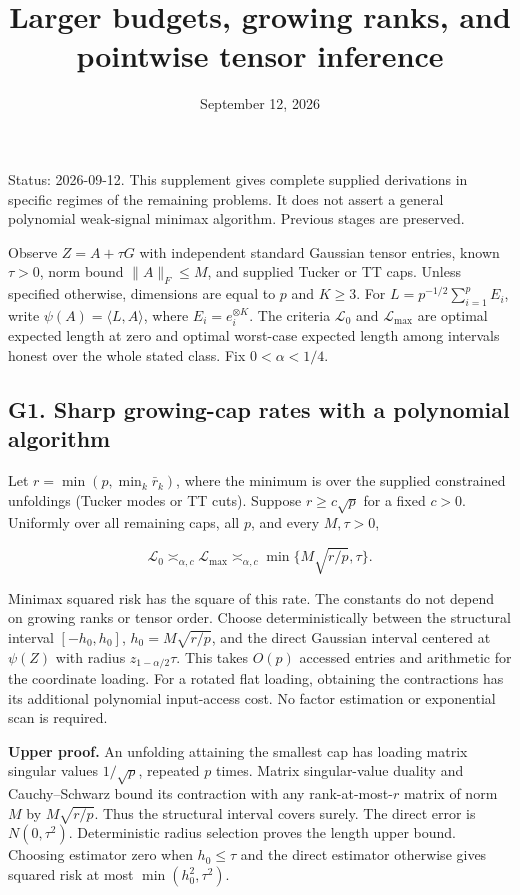 \documentclass[
  10pt,
]{article}
\title{Larger budgets, growing ranks, and pointwise tensor inference}
\author{}
\date{September 12, 2026}
\begin{document}
\maketitle

Status: 2026-09-12. This supplement gives complete supplied derivations
in specific regimes of the remaining problems. It does not assert a
general polynomial weak-signal minimax algorithm. Previous stages are
preserved.

Observe \(Z=A+\tau G\) with independent standard Gaussian tensor
entries, known \(\tau>0\), norm bound \(\|A\|_F\le M\), and supplied
Tucker or TT caps. Unless specified otherwise, dimensions are equal to
\(p\) and \(K\ge3\). For \(L=p^{-1/2}\sum_{i=1}^p E_i\), write
\(\psi(A)=\langle L,A\rangle\), where \(E_i=e_i^{\otimes K}\). The
criteria \(\mathcal L_0\) and \(\mathcal L_{\max}\) are optimal expected
length at zero and optimal worst-case expected length among intervals
honest over the whole stated class. Fix \(0<\alpha<1/4\).

\subsection{G1. Sharp growing-cap rates with a polynomial
algorithm}\label{g1.-sharp-growing-cap-rates-with-a-polynomial-algorithm}

Let \(r=\min(p,\min_k\bar r_k)\), where the minimum is over the supplied
constrained unfoldings (Tucker modes or TT cuts). Suppose
\(r\ge c\sqrt p\) for a fixed \(c>0\). Uniformly over all remaining
caps, all \(p\), and every \(M,\tau>0\),

\[\mathcal L_0\asymp_{\alpha,c}\mathcal L_{\max}
\asymp_{\alpha,c}\min\{M\sqrt{r/p},\tau\}.\]

Minimax squared risk has the square of this rate. The constants do not
depend on growing ranks or tensor order. Choose deterministically
between the structural interval \([-h_0,h_0]\), \(h_0=M\sqrt{r/p}\), and
the direct Gaussian interval centered at \(\psi(Z)\) with radius
\(z_{1-\alpha/2}\tau\). This takes \(O(p)\) accessed entries and
arithmetic for the coordinate loading. For a rotated flat loading,
obtaining the contractions has its additional polynomial input-access
cost. No factor estimation or exponential scan is required.

\textbf{Upper proof.} An unfolding attaining the smallest cap has
loading matrix singular values \(1/\sqrt p\), repeated \(p\) times.
Matrix singular-value duality and Cauchy--Schwarz bound its contraction
with any rank-at-most-\(r\) matrix of norm \(M\) by \(M\sqrt{r/p}\).
Thus the structural interval covers surely. The direct error is
\(N(0,\tau^2)\). Deterministic radius selection proves the length upper
bound. Choosing estimator zero when \(h_0\le\tau\) and the direct
estimator otherwise gives squared risk at most \(\min(h_0^2,\tau^2)\).
\end{document}
